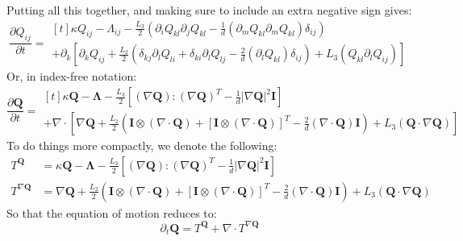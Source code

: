 \documentclass[reqno]{article}
\newcommand{\Q}{\mathbf{Q}}
\newcommand{\bLambda}{\boldsymbol{\Lambda}}
\begin{document}
Putting all this together, and making sure to include an extra negative sign gives:
\begin{equation}
    \frac{\partial Q_{ij}}{\partial t}
    =
    \begin{multlined}[t]
        \kappa Q_{ij}
        - \Lambda_{ij}
        - \frac{L_3}{2} \left( \partial_i Q_{kl} \partial_j Q_{kl} 
            - \tfrac{1}{d} \left(\partial_m Q_{kl} \partial_m Q_{kl} \right) \delta_{ij}
        \right) \\
        + \partial_k \left[
            \partial_k Q_{ij}
            + \frac{L_2}{2} \left( 
                \delta_{kj} \partial_l Q_{li} 
                + \delta_{ki} \partial_l Q_{lj} 
                - \tfrac{2}{d} \left( \partial_l Q_{kl} \right) \delta_{ij} \right)
            + L_3 \left( Q_{kl} \partial_l Q_{ij} \right)
        \right]
    \end{multlined}
\end{equation}
Or, in index-free notation:
\begin{equation}
    \frac{\partial \Q}{\partial t}
    =
    \begin{multlined}[t]
        \kappa \Q 
        - \bLambda 
        - \frac{L_3}{2} \left[ 
            \left( \nabla \Q \right) : \left( \nabla \Q \right)^T
            - \tfrac{1}{d} \left| \nabla \Q \right|^2 \mathbf I
        \right] \\
        + \nabla \cdot \left[
            \nabla \Q
            + \frac{L_2}{2} \left(
                \mathbf I \otimes \left( \nabla \cdot \Q \right) 
                + \left[ \mathbf I \otimes \left( \nabla \cdot \Q \right) \right]^T
                - \tfrac{2}{d} \left( \nabla \cdot \Q \right) \mathbf I
            \right)
            + L_3 \left( \Q \cdot \nabla \Q \right) 
        \right]
    \end{multlined}
\end{equation}
To do things more compactly, we denote the following:
\begin{align}
    T^\Q
    &=
    \kappa \Q 
    - \bLambda 
    - \frac{L_3}{2} \left[ 
        \left( \nabla \Q \right) : \left( \nabla \Q \right)^T
        - \tfrac{1}{d} \left| \nabla \Q \right|^2 \mathbf I
    \right] \\
    T^{\nabla \Q}
    &=
    \nabla \Q
    + \frac{L_2}{2} \left(
        \mathbf I \otimes \left( \nabla \cdot \Q \right) 
        + \left[ \mathbf I \otimes \left( \nabla \cdot \Q \right) \right]^T
        - \tfrac{2}{d} \left( \nabla \cdot \Q \right) \mathbf I
    \right)
    + L_3 \left( \Q \cdot \nabla \Q \right) 
\end{align}
So that the equation of motion reduces to:
\begin{equation}
    \partial_t \Q
    =
    T^\Q
    + \nabla \cdot T^{\nabla \Q}
\end{equation}
\end{document}
